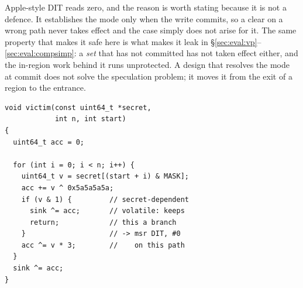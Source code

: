 Apple-style DIT reads zero, and the reason is worth stating because it is not a
defence. It establishes the mode only when the write commits, so a clear on a
wrong path never takes effect and the case simply does not arise for it. The
same property that makes it safe here is what makes it leak in
\S\ref{sec:eval:vp}--\ref{sec:eval:compsimp}: a \emph{set} that has not
committed has not taken effect either, and the in-region work behind it runs
unprotected. A design that resolves the mode at commit does not solve the
speculation problem; it moves it from the exit of a region to the entrance.

\begin{lstlisting}[float=t, caption={The speculation microbenchmark. The early
exit is guarded by a secret bit, so the clear the compiler places on that path
executes whenever the branch mispredicts.}, label=lst:sec-spec]
void victim(const uint64_t *secret,
            int n, int start)
{
  uint64_t acc = 0;

  for (int i = 0; i < n; i++) {
    uint64_t v = secret[(start + i) & MASK];
    acc += v ^ 0x5a5a5a5a;
    if (v & 1) {         // secret-dependent
      sink ^= acc;       // volatile: keeps
      return;            // this a branch
    }                    // -> msr DIT, #0
    acc ^= v * 3;        //    on this path
  }
  sink ^= acc;
}
\end{lstlisting}
